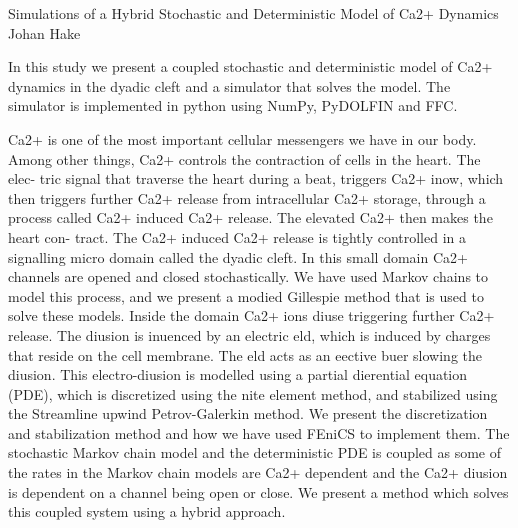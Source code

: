               {Simulations of a Hybrid Stochastic and Deterministic Model of Ca2+ Dynamics}
              {Johan Hake}

\editornote{[hake]}

In this study we present a coupled stochastic and deterministic model of Ca2+
dynamics in the dyadic cleft and a simulator that solves the model. The simulator
is implemented in python using NumPy, PyDOLFIN and FFC.

Ca2+ is one of the most important cellular messengers we have in our body.
Among other things, Ca2+ controls the contraction of cells in the heart. The elec-
tric signal that traverse the heart during a beat, triggers Ca2+ inow, which then
triggers further Ca2+ release from intracellular Ca2+ storage, through a process
called Ca2+ induced Ca2+ release. The elevated Ca2+ then makes the heart con-
tract. The Ca2+ induced Ca2+ release is tightly controlled in a signalling micro
domain called the dyadic cleft. In this small domain Ca2+ channels are opened and
closed stochastically. We have used Markov chains to model this process, and we
present a modied Gillespie method that is used to solve these models. Inside the
domain Ca2+ ions diuse triggering further Ca2+ release. The diusion is inuenced
by an electric eld, which is induced by charges that reside on the cell membrane.
The eld acts as an eective buer slowing the diusion. This electro-diusion is
modelled using a partial dierential equation (PDE), which is discretized using the
nite element method, and stabilized using the Streamline upwind Petrov-Galerkin
method. We present the discretization and stabilization method and how we have
used FEniCS to implement them. The stochastic Markov chain model and the
deterministic PDE is coupled as some of the rates in the Markov chain models
are Ca2+ dependent and the Ca2+ diusion is dependent on a channel being open
or close. We present a method which solves this coupled system using a hybrid
approach.
